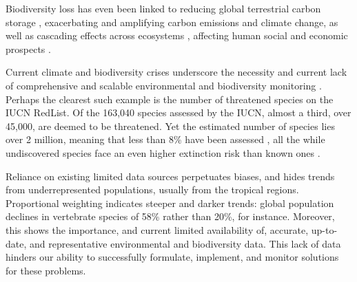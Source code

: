Biodiversity loss has even been linked to reducing global terrestrial carbon storage \cite{Weiskopf2024}, exacerbating and amplifying carbon emissions and climate change, as well as cascading effects across ecosystems \cite{Rosenberg2019, Ceballos2015}, affecting human social and economic prospects \cite{Frank2024, Portner2023}.


Current climate and biodiversity crises \cite{Pereira2024, Weiskopf2024, Pimm2014, Portner2023} underscore the necessity and current lack of comprehensive and scalable environmental and biodiversity monitoring \cite{Gonzalez2023a, McRae2017, Gonzalez2016, Mora2011}. 
Perhaps the clearest such example is the number of threatened species on the IUCN RedList. Of the 163,040 species assessed by the IUCN, almost a third, over 45,000, are deemed to be threatened. Yet the estimated number of species lies over 2 million, meaning that less than 8\% have been assessed \cite{IUCN2024}, all the while undiscovered species face an even higher extinction risk than known ones \cite{Liu2022a}.

Reliance on existing limited data sources perpetuates biases, and hides trends from underrepresented populations, usually from the tropical regions. Proportional weighting indicates steeper and darker trends: global population declines in vertebrate species of 58\% rather than 20\%, for instance\cite{McRae2017}. Moreover, this shows the importance, and current limited availability of, accurate, up-to-date, and representative environmental and biodiversity data. This lack of data hinders our ability to successfully  formulate, implement, and monitor solutions for these problems. 



